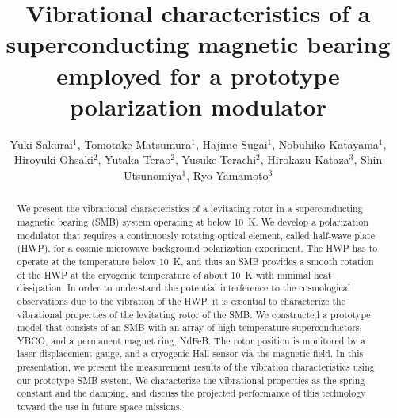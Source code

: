 \documentclass[a4paper]{jpconf}
\begin{document}
\title{Vibrational characteristics of a superconducting magnetic bearing employed for a prototype polarization modulator}

\author{Yuki Sakurai$^{1}$, Tomotake Matsumura$^{1}$, Hajime Sugai$^{1}$, Nobuhiko Katayama$^{1}$, Hiroyuki Ohsaki$^{2}$, Yutaka Terao$^{2}$, Yusuke Terachi$^{2}$, Hirokazu Kataza$^{3}$, Shin Utsunomiya$^{1}$, Ryo Yamamoto$^{3}$}
\vspace{2mm}
\address{
$^{1}$Kavli Institute for the Physics and Mathematics of the Universe (WPI),The University of Tokyo Institutes for Advanced Study, The University of Tokyo, 5-1-5 Kashiwanoha, Kashiwa, Chiba 277-8583, Japan \\
$^{2}$Graduate School of Frontier Sciences, The University of Tokyo, 5-1-5 Kashiwanoha, Kashiwa, Chiba 277-8561, Japan \\
$^{3}$Japan Aerospace Exploration Agency, Institute of Space and Astronautical Science (ISAS), 3-1-1 Yoshinodai, Chuo-ku, Sagamihara, Kanagawa 252-5210, Japan
}


\begin{abstract}
We present the vibrational characteristics of a levitating rotor in a superconducting magnetic bearing (SMB) system operating at below 10~K.
We develop a polarization modulator that requires a continuously rotating optical element, called half-wave plate (HWP), for a cosmic microwave background polarization experiment.
The HWP has to operate at the temperature below 10~K, and thus an SMB provides a smooth rotation of the HWP at the cryogenic temperature of about 10~K with minimal heat dissipation.
In order to understand the potential interference to the cosmological observations due to the vibration of the HWP,
it is essential to characterize the vibrational properties of the levitating rotor of the SMB.
We constructed a prototype model that consists of an SMB with an array of high temperature superconductors, YBCO, and a permanent magnet ring, NdFeB.
The rotor position is monitored by a laser displacement gauge, and a cryogenic Hall sensor via the magnetic field.
In this presentation, we present the measurement results of the vibration characteristics using our prototype SMB system.
We characterize the vibrational properties as the spring constant and the damping, and discuss the projected performance of this technology toward the use in future space missions.
\end{abstract}
\end{document}

